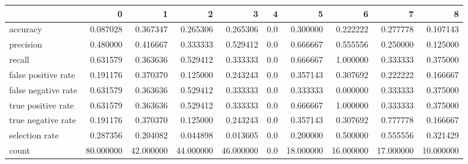 \begin{tabular}{lrrrrrrrrr}
\toprule
{} &          0 &          1 &          2 &          3 &    4 &          5 &          6 &          7 &          8 \\
\midrule
accuracy            &   0.087028 &   0.367347 &   0.265306 &   0.265306 &  0.0 &   0.300000 &   0.222222 &   0.277778 &   0.107143 \\
precision           &   0.480000 &   0.416667 &   0.333333 &   0.529412 &  0.0 &   0.666667 &   0.555556 &   0.250000 &   0.125000 \\
recall              &   0.631579 &   0.363636 &   0.529412 &   0.333333 &  0.0 &   0.666667 &   1.000000 &   0.333333 &   0.375000 \\
false positive rate &   0.191176 &   0.370370 &   0.125000 &   0.243243 &  0.0 &   0.357143 &   0.307692 &   0.222222 &   0.166667 \\
false negative rate &   0.631579 &   0.363636 &   0.529412 &   0.333333 &  0.0 &   0.333333 &   0.000000 &   0.333333 &   0.375000 \\
true positive rate  &   0.631579 &   0.363636 &   0.529412 &   0.333333 &  0.0 &   0.666667 &   1.000000 &   0.333333 &   0.375000 \\
true negative rate  &   0.191176 &   0.370370 &   0.125000 &   0.243243 &  0.0 &   0.357143 &   0.307692 &   0.777778 &   0.166667 \\
selection rate      &   0.287356 &   0.204082 &   0.044898 &   0.013605 &  0.0 &   0.200000 &   0.500000 &   0.555556 &   0.321429 \\
count               &  80.000000 &  42.000000 &  44.000000 &  46.000000 &  0.0 &  18.000000 &  16.000000 &  17.000000 &  10.000000 \\
\bottomrule
\end{tabular}
